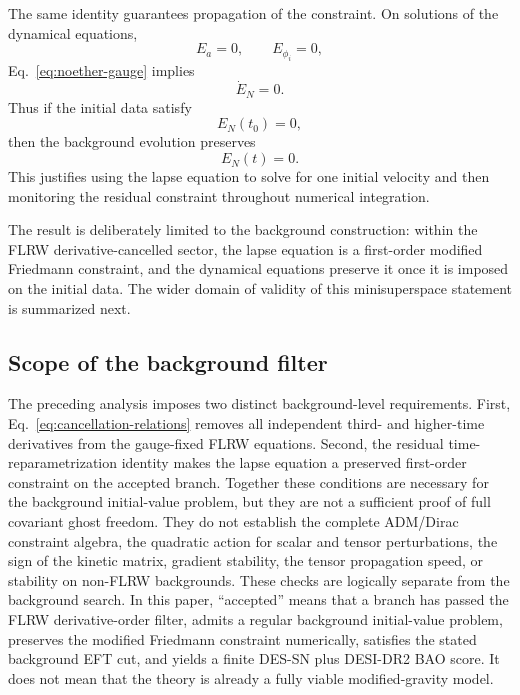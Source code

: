 \documentclass[aps,prd,twocolumn,superscriptaddress,nofootinbib,longbibliography]{revtex4-2}
\begin{document}
The same identity guarantees propagation of the constraint.  On solutions of the dynamical equations,
\begin{equation}
E_a=0,\qquad E_{\phi_i}=0,
\end{equation}
Eq.~\eqref{eq:noether-gauge} implies
\begin{equation}
\dot E_N=0.
\end{equation}
Thus if the initial data satisfy
\begin{equation}
E_N(t_0)=0,
\end{equation}
then the background evolution preserves
\begin{equation}
E_N(t)=0.
\end{equation}
This justifies using the lapse equation to solve for one initial velocity and then monitoring the residual constraint throughout numerical integration.

The result is deliberately limited to the background construction: within the FLRW derivative-cancelled sector, the lapse equation is a first-order modified Friedmann constraint, and the dynamical equations preserve it once it is imposed on the initial data.  The wider domain of validity of this minisuperspace statement is summarized next.

\subsection{Scope of the background filter}
\label{subsec:ghost-scope}

The preceding analysis imposes two distinct background-level requirements.  First, Eq.~\eqref{eq:cancellation-relations} removes all independent third- and higher-time derivatives from the gauge-fixed FLRW equations.  Second, the residual time-reparametrization identity makes the lapse equation a preserved first-order constraint on the accepted branch.  Together these conditions are necessary for the background initial-value problem, but they are not a sufficient proof of full covariant ghost freedom.  They do not establish the complete ADM/Dirac constraint algebra, the quadratic action for scalar and tensor perturbations, the sign of the kinetic matrix, gradient stability, the tensor propagation speed, or stability on non-FLRW backgrounds.  These checks are logically separate from the background search.  In this paper, ``accepted'' means that a branch has passed the FLRW derivative-order filter, admits a regular background initial-value problem, preserves the modified Friedmann constraint numerically, satisfies the stated background EFT cut, and yields a finite DES-SN plus DESI-DR2 BAO score.  It does not mean that the theory is already a fully viable modified-gravity model.
\end{document}
